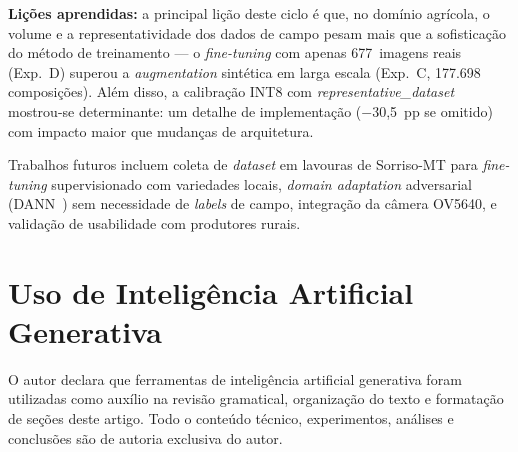 \documentclass[12pt]{article}
\begin{document}
\textbf{Lições aprendidas:} a principal lição deste ciclo é que, no domínio
agrícola, o volume e a representatividade dos dados de campo pesam mais que a
sofisticação do método de treinamento --- o \textit{fine-tuning} com apenas
677~imagens reais (Exp.~D) superou a \textit{augmentation} sintética em larga escala
(Exp.~C, 177.698
composições). Além disso, a calibração INT8 com \textit{representative\_dataset}
mostrou-se determinante: um detalhe de implementação ($-$30,5~pp se omitido) com
impacto maior que mudanças de arquitetura.

Trabalhos futuros incluem coleta de \textit{dataset} em lavouras de Sorriso-MT para
\textit{fine-tuning} supervisionado com variedades locais, \textit{domain adaptation}
adversarial (DANN~\cite{ganin2016}) sem necessidade de \textit{labels} de campo,
integração da câmera
OV5640, e validação de usabilidade com produtores rurais.


\section*{Uso de Inteligência Artificial Generativa}

O autor declara que ferramentas de inteligência artificial generativa
foram utilizadas como auxílio na revisão gramatical, organização do
texto e formatação de seções deste artigo. Todo o conteúdo técnico,
experimentos, análises e conclusões são de autoria exclusiva do autor.



\end{document}
